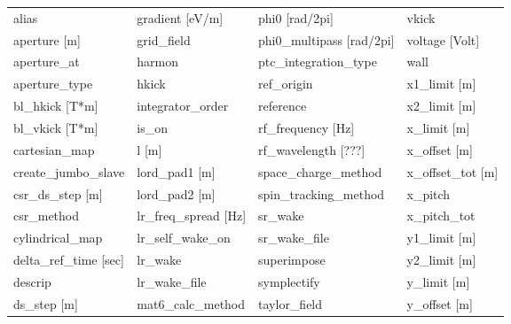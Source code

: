  \begin{tabular}{llll} \toprule
alias                            & gradient [eV/m]                  & phi0 [rad/2pi]                   & vkick                            \\
aperture [m]                     & grid_field                       & phi0_multipass [rad/2pi]         & voltage [Volt]                   \\
aperture_at                      & harmon                           & ptc_integration_type             & wall                             \\
aperture_type                    & hkick                            & ref_origin                       & x1_limit [m]                     \\
bl_hkick [T*m]                   & integrator_order                 & reference                        & x2_limit [m]                     \\
bl_vkick [T*m]                   & is_on                            & rf_frequency [Hz]                & x_limit [m]                      \\
cartesian_map                    & l [m]                            & rf_wavelength [???]              & x_offset [m]                     \\
create_jumbo_slave               & lord_pad1 [m]                    & space_charge_method              & x_offset_tot [m]                 \\
csr_ds_step [m]                  & lord_pad2 [m]                    & spin_tracking_method             & x_pitch                          \\
csr_method                       & lr_freq_spread [Hz]              & sr_wake                          & x_pitch_tot                      \\
cylindrical_map                  & lr_self_wake_on                  & sr_wake_file                     & y1_limit [m]                     \\
delta_ref_time [sec]             & lr_wake                          & superimpose                      & y2_limit [m]                     \\
descrip                          & lr_wake_file                     & symplectify                      & y_limit [m]                      \\
ds_step [m]                      & mat6_calc_method                 & taylor_field                     & y_offset [m]                     \\

\end{tabular}
